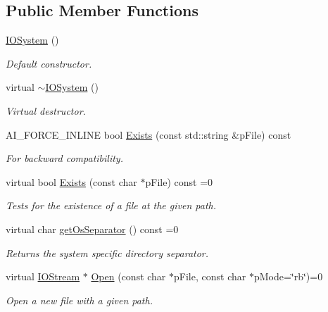 \subsection*{Public Member Functions}
\begin{DoxyCompactItemize}
\item 
\hyperlink{class_assimp_1_1_i_o_system_af8ba1ee2dc0686da8fc9e3dad49af801}{I\-O\-System} ()
\begin{DoxyCompactList}\small\item\em Default constructor. \end{DoxyCompactList}\item 
virtual \hyperlink{class_assimp_1_1_i_o_system_a617417f1c5125770606fea3b41068b36}{$\sim$\-I\-O\-System} ()
\begin{DoxyCompactList}\small\item\em Virtual destructor. \end{DoxyCompactList}\item 
A\-I\-\_\-\-F\-O\-R\-C\-E\-\_\-\-I\-N\-L\-I\-N\-E bool \hyperlink{class_assimp_1_1_i_o_system_a7ae6cfaea4957408967463bfc3b84b27}{Exists} (const std\-::string \&p\-File) const 
\begin{DoxyCompactList}\small\item\em For backward compatibility. \end{DoxyCompactList}\item 
virtual bool \hyperlink{class_assimp_1_1_i_o_system_a79f5fe8d2dbe1056c9418f7de9a72445}{Exists} (const char $\ast$p\-File) const =0
\begin{DoxyCompactList}\small\item\em Tests for the existence of a file at the given path. \end{DoxyCompactList}\item 
virtual char \hyperlink{class_assimp_1_1_i_o_system_a40e412875b985bdb638f00ef0f20fff6}{get\-Os\-Separator} () const =0
\begin{DoxyCompactList}\small\item\em Returns the system specific directory separator. \end{DoxyCompactList}\item 
virtual \hyperlink{class_assimp_1_1_i_o_stream}{I\-O\-Stream} $\ast$ \hyperlink{class_assimp_1_1_i_o_system_ac512ece3b0701de5682553007a4c0816}{Open} (const char $\ast$p\-File, const char $\ast$p\-Mode=\char`\"{}rb\char`\"{})=0
\begin{DoxyCompactList}\small\item\em Open a new file with a given path. \end{DoxyCompactList}\item 

\end{DoxyCompactItemize}
